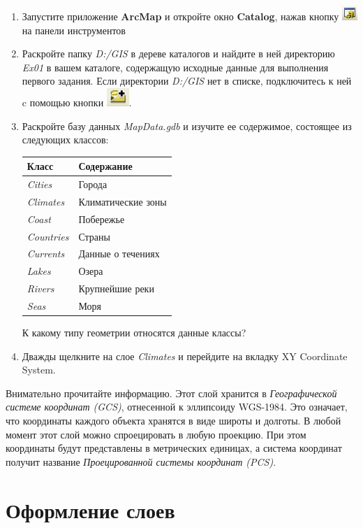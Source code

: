 \documentclass[]{book}
\theoremstyle{definition}
\theoremstyle{definition}
\theoremstyle{definition}
\theoremstyle{remark}
\begin{document}
\begin{enumerate}
\def\labelenumi{\arabic{enumi}.}
\item
  Запустите приложение \textbf{ArcMap} и откройте окно \textbf{Catalog},
  нажав кнопку \includegraphics{images/Ex01/image5.png} на панели
  инструментов
\item
  Раскройте папку \emph{D:/GIS} в дереве каталогов и найдите в ней
  директорию \emph{Ex01} в вашем каталоге, содержащую исходные данные
  для выполнения первого задания. Если директории \emph{D:/GIS} нет в
  списке, подключитесь к ней c помощью кнопки
  \includegraphics{images/Ex01/image6.png}.
\item
  Раскройте базу данных \emph{MapData.gdb} и изучите ее содержимое,
  состоящее из следующих классов:

  \begin{longtable}[]{@{}ll@{}}
  \toprule
  \textbf{Класс} & \textbf{Содержание}\tabularnewline
  \midrule
  \endhead
  \emph{Cities} & Города\tabularnewline
  \emph{Climates} & Климатические зоны\tabularnewline
  \emph{Coast} & Побережье\tabularnewline
  \emph{Countries} & Страны\tabularnewline
  \emph{Currents} & Данные о течениях\tabularnewline
  \emph{Lakes} & Озера\tabularnewline
  \emph{Rivers} & Крупнейшие реки\tabularnewline
  \emph{Seas} & Моря\tabularnewline
  \bottomrule
  \end{longtable}

  К какому типу геометрии относятся данные классы?
\item
  Дважды щелкните на слое \emph{Climates} и перейдите на вкладку XY
  Coordinate System.
\end{enumerate}

Внимательно прочитайте информацию. Этот слой хранится в
\emph{Географической системе координат (GCS)}, отнесенной к эллипсоиду
WGS-1984. Это означает, что координаты каждого объекта хранятся в виде
широты и долготы. В любой момент этот слой можно спроецировать в любую
проекцию. При этом координаты будут представлены в метрических единицах,
а система координат получит название \emph{Проецированной системы
координат (PCS)}.

\hypertarget{map-design-climates-layers}{%
\section{Оформление слоев}\label{map-design-climates-layers}}
\end{document}
